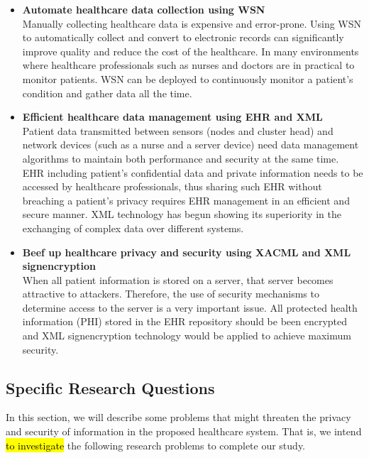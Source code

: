 \documentclass[a4paper,11pt]{article}
\DeclareRobustCommand{\hlyellow}[1]{{\sethlcolor{white}\hl{#1}}}
\begin{document}
\begin{itemize}
\item \textbf{Automate healthcare data collection using WSN} \\ 
Manually collecting healthcare data is expensive and error-prone. Using WSN to automatically collect and convert to electronic records can significantly improve quality and reduce the cost of the healthcare. In many environments where healthcare professionals such as nurses and doctors are in practical to monitor patients. WSN can be deployed to continuously monitor a patient's condition and gather data all the time.
\item \textbf{Efficient healthcare data management using EHR and XML}\\
Patient data transmitted between sensors (nodes and cluster head) and network devices (such as a nurse and a server device) need data management algorithms to maintain both performance and security at the same time. EHR including patient's confidential data and private information needs to be accessed by healthcare professionals, thus sharing such EHR without breaching a patient's privacy requires EHR management in an efficient and secure manner. XML technology has begun showing its superiority in the exchanging of complex data over different systems.
\item \textbf{Beef up healthcare privacy and security using XACML and XML signencryption}\\
When all patient information is stored on a server, that server becomes attractive to attackers. Therefore, the use of security mechanisms to determine access to the server is a very important issue. All protected health information (PHI) stored in the EHR repository should be been encrypted and XML signencryption technology would be applied to achieve maximum security. 
\end{itemize}


\subsection{Specific Research Questions}
In this section, we will describe some problems that might threaten the privacy and security of information in the proposed healthcare system. That is, we intend \hlyellow{to investigate} the following research problems to complete our study.
\end{document}
